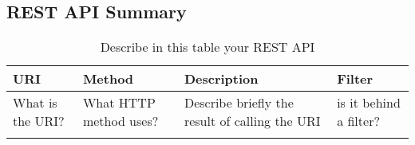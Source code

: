 

\subsection{REST API Summary}


\begin{longtable}{|p{}|p{} |p{}|p{}|} 
\hline
\textbf{URI} & \textbf{Method} & \textbf{Description} & \textbf{Filter} \\\hline
What is the URI? & What HTTP method uses? &  Describe briefly the result of calling the URI & is it behind a filter?\\\hline
\caption{Describe in this table your REST API}
\label{tab:termGlossary}
\end{longtable}
